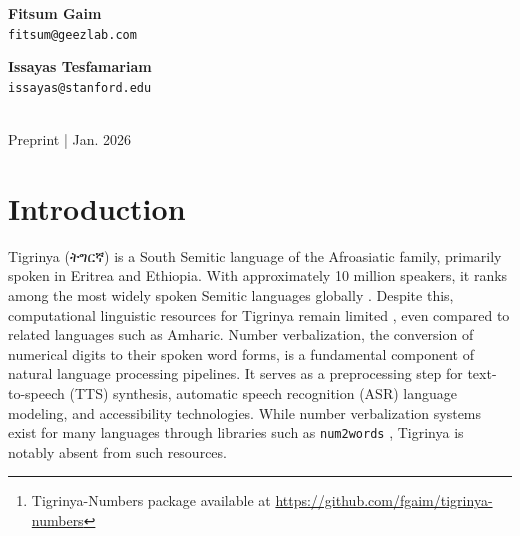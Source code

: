 \documentclass{article}
\newcommand{\ti}[1]{{\geezfont #1}}
\begin{document}

\begin{icmlauthorlist}
\end{icmlauthorlist}

\begin{center}
\begin{minipage}[t]{0.25\textwidth}
\centering
{\bf Fitsum Gaim} \\
\texttt{fitsum@geezlab.com}
\end{minipage}
\hspace{0.1cm}
\begin{minipage}[t]{0.25\textwidth}
\centering
{\bf Issayas Tesfamariam} \\
\texttt{issayas@stanford.edu}
\end{minipage}
\\[1em]
{Preprint | Jan. 2026}
\end{center}

\vskip 0.3in

\begin{abstract}
We present a systematic formalization of Tigrinya cardinal and ordinal number verbalization, addressing a gap in computational resources for the language. This work documents the canonical rules governing the expression of numerical values in spoken Tigrinya, including the conjunction system, scale words, and special cases for dates, times, and currency. We provide a formal algorithm for number-to-word conversion and release an open-source implementation.\footnote{Tigrinya-Numbers package available at \url{https://github.com/fgaim/tigrinya-numbers}} Evaluation of frontier large language models (LLMs) reveals significant gaps in their ability to accurately verbalize Tigrinya numbers, underscoring the need for explicit rule documentation. This work serves language modeling, speech synthesis, and accessibility applications targeting Tigrinya-speaking communities.
\end{abstract}

\section{Introduction}

Tigrinya (\ti{ትግርኛ}) is a South Semitic language of the Afroasiatic family, primarily spoken in Eritrea and Ethiopia. With approximately 10 million speakers, it ranks among the most widely spoken Semitic languages globally \citep{eberhard-etal-2024-ethnologue}. Despite this, computational linguistic resources for Tigrinya remain limited \citep{gaim-park-2025-tigrinya-nlp}, even compared to related languages such as Amharic.
Number verbalization, the conversion of numerical digits to their spoken word forms, is a fundamental component of natural language processing pipelines. It serves as a preprocessing step for text-to-speech (TTS) synthesis, automatic speech recognition (ASR) language modeling, and accessibility technologies. While number verbalization systems exist for many languages through libraries such as \texttt{num2words} \citep{num2words}, Tigrinya is notably absent from such resources.
\end{document}
